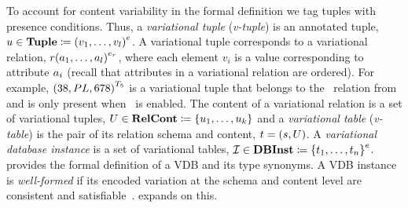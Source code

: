 To account 
for content variability in the formal definition we tag tuples with 
presence conditions. 
%
Thus, a \emph{variational tuple} (\emph{v-tuple}) is an annotated tuple,
$\vTuple\in\tupletype \eqq \annot[\dimMeta]{(\vi v \numAtts)}$. A
variational tuple corresponds to a variational relation,
$\vRel\annot[\dimMeta_\vRel]{(\vi \vAtt \numAtts)}$,
where each element $v_i$ is a value corresponding to attribute $\vAtt_i$
(recall that attributes in a variational relation are ordered).
%
For example, $\annot[\tFive]{(38, PL, 678)}$ is a variational tuple that belongs to the
\ecourse\ relation from  and is only present when \tFive\ is
enabled. 
%
The content of a variational relation
is a set of variational tuples,
$\vRelCont \in \vRelContSet \eqq \setDef {\vi \vTuple \numTuples}$
and 
%
a \emph{variational table} (\emph{v-table}) is the pair of its relation
schema and content, $\vTab = (\vRelSch, \vRelCont)$.
%
A \emph{variational database instance}
is a set of variational tables,
$\synDef \vdbInst  \vdbInstSet \eqq \annot [\dimMeta] {\setDef {\vi \vTab \numRels} }$.
%
 provides the formal definition of a VDB and its type synonyms.
A VDB instance is \emph{well-formed} if its encoded variation at
the schema and content level are consistent and satisfiable~\cite{ALW21vamos}.
 expands on this. 







